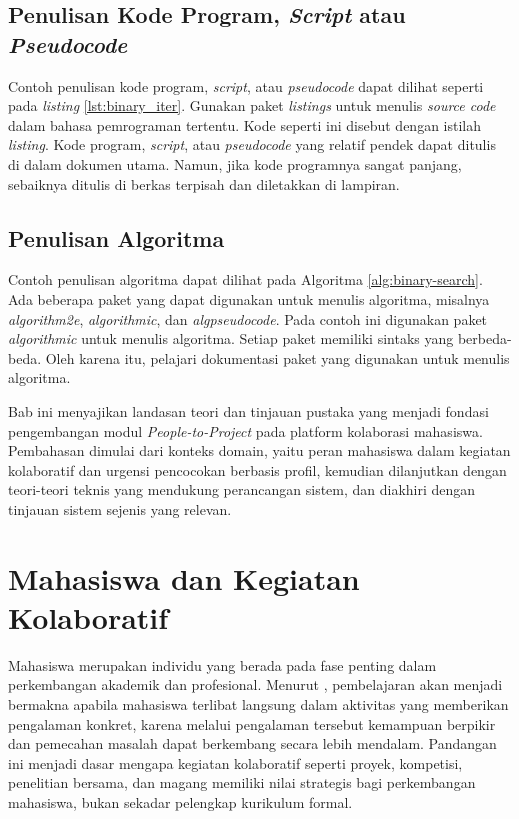 \subsection{Penulisan Kode Program, \textit{Script} atau \textit{Pseudocode}}
Contoh penulisan kode program, \textit{script}, atau \textit{pseudocode} dapat dilihat seperti pada \textit{listing} \ref{lst:binary_iter}.
Gunakan paket \textit{listings} untuk menulis \textit{source code} dalam bahasa pemrograman tertentu.
Kode seperti ini disebut dengan istilah \textit{listing}.
Kode program, \textit{script}, atau \textit{pseudocode} yang relatif pendek dapat ditulis di dalam
dokumen utama. Namun, jika kode programnya sangat panjang, sebaiknya ditulis di berkas terpisah dan diletakkan di lampiran.

\subsection{Penulisan Algoritma}
Contoh penulisan algoritma dapat dilihat pada Algoritma \ref{alg:binary-search}. Ada beberapa paket yang dapat digunakan untuk menulis algoritma,
misalnya \textit{algorithm2e}, \textit{algorithmic}, dan \textit{algpseudocode}.
Pada contoh ini digunakan paket \textit{algorithmic} untuk menulis algoritma. Setiap paket memiliki sintaks yang berbeda-beda.
Oleh karena itu, pelajari dokumentasi paket yang digunakan untuk menulis algoritma.





\fi

Bab ini menyajikan landasan teori dan tinjauan pustaka yang menjadi fondasi pengembangan modul \emph{People-to-Project} pada platform kolaborasi mahasiswa. Pembahasan dimulai dari konteks domain, yaitu peran mahasiswa dalam kegiatan kolaboratif dan urgensi pencocokan berbasis profil, kemudian dilanjutkan dengan teori-teori teknis yang mendukung perancangan sistem, dan diakhiri dengan tinjauan sistem sejenis yang relevan.

\section{Mahasiswa dan Kegiatan Kolaboratif}

Mahasiswa merupakan individu yang berada pada fase penting dalam perkembangan akademik dan profesional. Menurut \textcite{dewey1938}, pembelajaran akan menjadi bermakna apabila mahasiswa terlibat langsung dalam aktivitas yang memberikan pengalaman konkret, karena melalui pengalaman tersebut kemampuan berpikir dan pemecahan masalah dapat berkembang secara lebih mendalam. Pandangan ini menjadi dasar mengapa kegiatan kolaboratif seperti proyek, kompetisi, penelitian bersama, dan magang memiliki nilai strategis bagi perkembangan mahasiswa, bukan sekadar pelengkap kurikulum formal.

